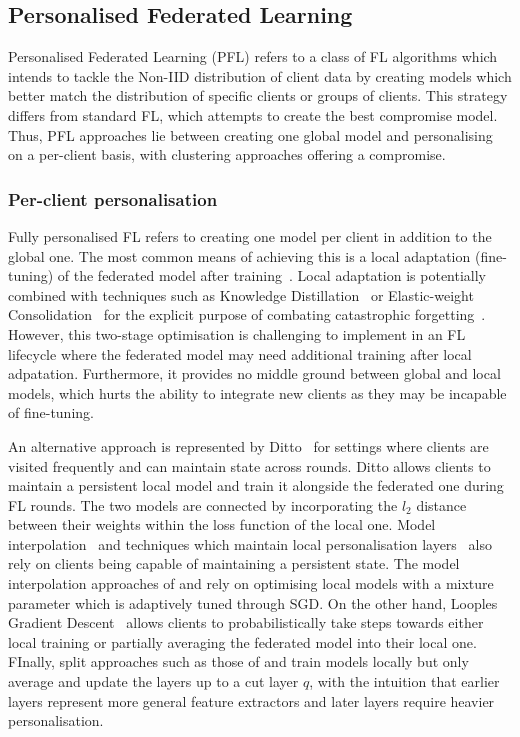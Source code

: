\subsection{Personalised Federated Learning}

Personalised Federated Learning (PFL) refers to a class of FL algorithms which intends to tackle the Non-IID distribution of client data by creating models which better match the distribution of specific clients or groups of clients. This strategy differs from standard FL, which attempts to create the best compromise model. Thus, PFL approaches lie between creating one global model and personalising on a per-client basis, with clustering approaches offering a compromise.

\subsubsection{Per-client personalisation}

Fully personalised FL refers to creating one model per client in addition to the global one. The most common means of achieving this is a local adaptation (fine-tuning) of the federated model after training~\citep{SalvagingFL}. Local adaptation is potentially combined with techniques such as Knowledge Distillation~\citep{DeepMutualLearning} or Elastic-weight Consolidation~\citep{kirkpatrick2017overcoming} for the explicit purpose of combating catastrophic forgetting~\citep{CatForgetting1}. However, this two-stage optimisation is challenging to implement in an FL lifecycle where the federated model may need additional training after local adpatation. Furthermore, it provides no middle ground between global and local models, which hurts the ability to integrate new clients as they may be incapable of fine-tuning.

An alternative approach is represented by Ditto~\citep{Ditto} for settings where clients are visited frequently and can maintain state across rounds. Ditto allows clients to maintain a persistent local model and train it alongside the federated one during FL rounds. The two models are connected by incorporating the $l_2$ distance between their weights within the loss function of the local one.  Model interpolation~\citep{ThreeApproachesMansour,AdaptivePersonalisedFederatedLearning,FederatedLearningMixtureOfGlobalAndLocal} and techniques which maintain local personalisation layers~\citep{FlWithPersonalisationLayers,FedSplitBert} also rely on clients being capable of maintaining a persistent state. The model interpolation approaches of \citet{ThreeApproachesMansour} and \citet{AdaptivePersonalisedFederatedLearning} rely on optimising local models with a mixture parameter which is adaptively tuned through SGD. On the other hand, Looples Gradient Descent~\citep{FederatedLearningMixtureOfGlobalAndLocal} allows clients to probabilistically take steps towards either local training or partially averaging the federated model into their local one. FInally, split approaches such as those of \citet{FlWithPersonalisationLayers} and \citet{FedSplitBert} train models locally but only average and update the layers up to a cut layer $q$, with the intuition that earlier layers represent more general feature extractors and later layers require heavier personalisation.

